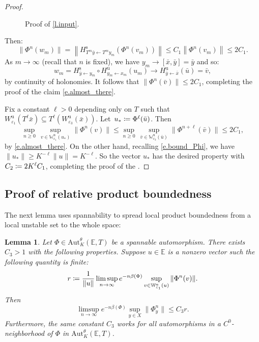 \documentclass[10pt]{amsart}
\def\vcentcolon{\mathrel{\mathop\ordinarycolon}}
\providecommand\ordinarycolon{:}
\providecommand*\coloneqq{\vcentcolon\mathrel{\mkern-1.2mu}=}
\theoremstyle{plain}
\newtheorem{lemma}[theorem]{Lemma}
\theoremstyle{definition}
\newcommand{\EE}{\mathbb{E}}
\newcommand{\WW}{\mathbb{W}}
\newcommand{\uu}{\mathrm{u}}
\renewcommand{\ss}{\mathrm{s}}
\newcommand{\Aut}{\mathrm{Aut}}
\let\epsilon\varepsilon
\begin{document}
\begin{proof}
\begin{figure}[hbt]
\begin{center}
	\caption{Proof of \cref{l.input}.}\label{f.input}
	\end{center}
\end{figure}

Then:
\[
\|\Phi^n(w_m) \|
= \left\| H^\ss_{T^m \bar{y} \gets T^m y_m} (\Phi^n(v_m)) \right\|
\le C_1 \left\| \Phi^n(v_m) \right\|
\le 2C_1.
\]
As $m \to \infty$ (recall that $n$ is fixed), we have $y_m \to [\bar{x},\bar{y}] = \bar{y}$
and so:
\[
w_m = H^\ss_{\bar{y} \gets y_m} \circ H^\uu_{y_m \gets x_m}(u_m) \to H^\uu_{\bar{y} \gets \bar{x}}(\bar{u}) = \bar{v},
\]
by continuity of holonomies.
It follows that $\|\Phi^n(\bar{v}) \| \le 2 C_1$, completing the proof of the claim \eqref{e.almost_there}.

Fix a constant $\ell > 0$ depending only on $T$ such that $W^\uu_{\epsilon_1}(T^\ell \bar{x}) \subseteq T^\ell(W^\uu_{\epsilon_3}(\bar{x}))$.
Let~$u_* \coloneqq \Phi^\ell(\bar{u})$.
Then
\[
\sup_{n \ge 0} \, \sup_{v \in \WW^\uu_{\epsilon_1}(u_*)} \| \Phi^n (v) \| \le
\sup_{n \ge 0} \, \sup_{\bar{v} \in \WW^\uu_{\epsilon_3}(\bar{u})} \| \Phi^{n+\ell} (\bar{v}) \| \le 2C_1,
\]
by \eqref{e.almost_there}.
On the other hand, recalling \eqref{e.bound_Phi}, we have $\|u_*\| \ge K^{-\ell} \|u\| = K^{-\ell}$.
So the vector $u_*$ has the desired property with $C_2 \coloneqq 2 K^\ell C_1$, completing the proof of the .
\end{proof}

\subsection{Proof of relative product boundedness}\label{ss.bounded_proof}

The next lemma uses spannability to spread local product boundedness from a local unstable set to the whole space:

\begin{lemma}\label{l.key}
Let $\Phi\!\in\!\Aut^\theta_K(\EE,T)$ be a spannable automorphism.
There exists $C_3\!>\!1$ with the following properties.
Suppose $u \in \EE$ is a nonzero vector such the following quantity is finite:
\[
r \coloneqq \frac{1}{\|u\|}
\limsup_{n \to \infty} e^{-n \beta(\Phi)}\sup_{v \in \WW^\uu_{\epsilon_1}(u)} \|\Phi^n(v)\|.
\]
Then
\[
\limsup_{n \to \infty} e^{-n \beta(\Phi)} \sup_{y \in X} \|\Phi^n_y \| \le C_3 r.
\]
Furthermore, the same constant $C_3$ works for all automorphisms in a $C^0$-neighborhood of $\Phi$ in $\Aut^\theta_K(\EE,T)$.
\end{lemma}
\end{document}
